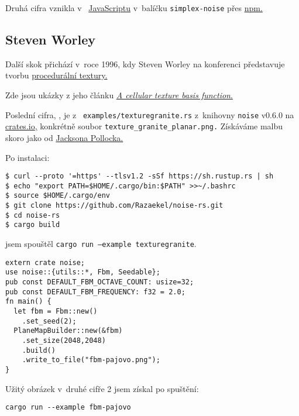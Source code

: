 Druhá cifra {} vznikla v~%
\href{https://www.npmjs.com/package/simplex-noise}{JavaScriptu} v~balíčku \texttt{simplex-noise} přes \href{https://www.npmjs.com/}{\url{npm}.}

\noindent
{}

\subsection{Steven Worley}
Další skok přichází v~roce 1996, kdy Steven Worley na konferenci představuje tvorbu 
\href{https://cs.wikipedia.org/wiki/Texturov%C3%A1n%C3%AD}{procedurální textury.}

\noindent
{}


Zde jsou ukázky z jeho článku 
\href{https://dl.acm.org/doi/10.1145/237170.237267}{\textit{A cellular texture basis function}.}

\noindent
{}\hfill



Poslední cifra, {}, je z~%
\texttt{examples/texturegranite.rs}
z~knihovny \texttt{noise} v0.6.0 na \href{https://crates.io/crates/noise}{\url{crates.io},} konkrétně soubor \texttt{texture\_granite\_planar.png.} 
Získáváme malbu skoro jako od 
\href{https://www.jackson-pollock.org/}{Jacksona Pollocka.}

Po instalaci:
\begin{lstlisting}
$ curl --proto '=https' --tlsv1.2 -sSf https://sh.rustup.rs | sh
$ echo "export PATH=$HOME/.cargo/bin:$PATH" >>~/.bashrc
$ source $HOME/.cargo/env
$ git clone https://github.com/Razaekel/noise-rs.git
$ cd noise-rs
$ cargo build
\end{lstlisting}
jsem spouštěl
\texttt{cargo run --example texturegranite}.
\smallskip

\ifx\relax
\begin{lstlisting}
extern crate noise;
use noise::{utils::*, Fbm, Seedable};
pub const DEFAULT_FBM_OCTAVE_COUNT: usize=32;
pub const DEFAULT_FBM_FREQUENCY: f32 = 2.0;
fn main() {
  let fbm = Fbm::new()
    .set_seed(2);
  PlaneMapBuilder::new(&fbm)
    .set_size(2048,2048)
    .build()
    .write_to_file("fbm-pajovo.png");
}
\end{lstlisting}\par
Užitý obrázek v~druhé cifře 2 jsem získal po spuštění:
\begin{lstlisting}
cargo run --example fbm-pajovo
\end{lstlisting}
\fi

